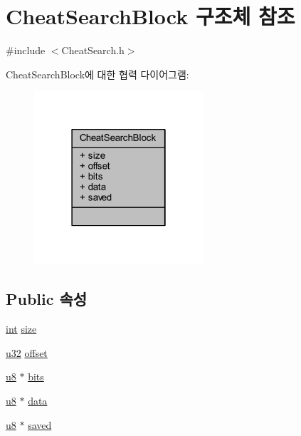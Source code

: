 \hypertarget{struct_cheat_search_block}{}\section{Cheat\+Search\+Block 구조체 참조}
\label{struct_cheat_search_block}


{\ttfamily \#include $<$Cheat\+Search.\+h$>$}



Cheat\+Search\+Block에 대한 협력 다이어그램\+:\nopagebreak
\begin{figure}[H]
\begin{center}
\leavevmode
\includegraphics[width=178pt]{struct_cheat_search_block__coll__graph}
\end{center}
\end{figure}
\subsection*{Public 속성}
\begin{DoxyCompactItemize}
\item 
\mbox{\hyperlink{_util_8cpp_a0ef32aa8672df19503a49fab2d0c8071}{int}} \mbox{\hyperlink{struct_cheat_search_block_aaaf9517229363e8807cd511022d90012}{size}}
\item 
\mbox{\hyperlink{_system_8h_a10e94b422ef0c20dcdec20d31a1f5049}{u32}} \mbox{\hyperlink{struct_cheat_search_block_a33001049203a8b1b625ccdd29bf57d8f}{offset}}
\item 
\mbox{\hyperlink{_system_8h_aed742c436da53c1080638ce6ef7d13de}{u8}} $\ast$ \mbox{\hyperlink{struct_cheat_search_block_a59258efebf4223be206ad11d3ca8ebf4}{bits}}
\item 
\mbox{\hyperlink{_system_8h_aed742c436da53c1080638ce6ef7d13de}{u8}} $\ast$ \mbox{\hyperlink{struct_cheat_search_block_aa3a8235324df132c5fc67c5239748f15}{data}}
\item 
\mbox{\hyperlink{_system_8h_aed742c436da53c1080638ce6ef7d13de}{u8}} $\ast$ \mbox{\hyperlink{struct_cheat_search_block_af2b921cffd3f8d9420a8b9a3a33752ca}{saved}}
\end{DoxyCompactItemize}


